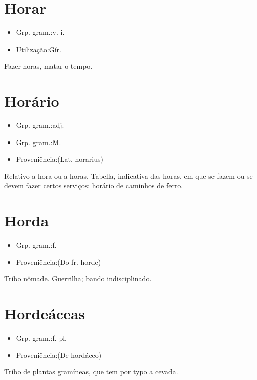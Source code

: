 \documentclass{article}
\begin{document}
\section{Horar}
\begin{itemize}
\item {Grp. gram.:v. i.}
\end{itemize}
\begin{itemize}
\item {Utilização:Gír.}
\end{itemize}
Fazer horas, matar o tempo.
\section{Horário}
\begin{itemize}
\item {Grp. gram.:adj.}
\end{itemize}
\begin{itemize}
\item {Grp. gram.:M.}
\end{itemize}
\begin{itemize}
\item {Proveniência:(Lat. \textunderscore horarius\textunderscore )}
\end{itemize}
Relativo a hora ou a horas.
Tabella, indicativa das horas, em que se fazem ou se devem fazer certos serviços: \textunderscore horário de caminhos de ferro\textunderscore .
\section{Horda}
\begin{itemize}
\item {Grp. gram.:f.}
\end{itemize}
\begin{itemize}
\item {Proveniência:(Do fr. \textunderscore horde\textunderscore )}
\end{itemize}
Tríbo nômade.
Guerrilha; bando indisciplinado.
\section{Hordeáceas}
\begin{itemize}
\item {Grp. gram.:f. pl.}
\end{itemize}
\begin{itemize}
\item {Proveniência:(De \textunderscore hordáceo\textunderscore )}
\end{itemize}
Tríbo de plantas gramíneas, que tem por typo a cevada.
\end{document}
